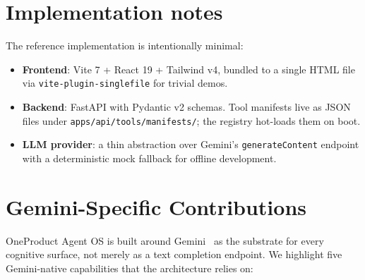 \documentclass[11pt,a4paper]{article}
\begin{document}
\section{Implementation notes}

The reference implementation is intentionally minimal:

\begin{itemize}
  \item \textbf{Frontend}: Vite 7 + React 19 + Tailwind v4, bundled to a single
    HTML file via \texttt{vite-plugin-singlefile} for trivial demos.
  \item \textbf{Backend}: FastAPI with Pydantic v2 schemas. Tool manifests live
    as JSON files under \texttt{apps/api/tools/manifests/}; the registry hot-loads
    them on boot.
  \item \textbf{LLM provider}: a thin abstraction over Gemini's
    \texttt{generateContent} endpoint with a deterministic mock fallback for
    offline development.
\end{itemize}

\section{Gemini-Specific Contributions}
\label{sec:gemini}

OneProduct Agent OS is built around Gemini~\cite{gemini2024} as the substrate
for every cognitive surface, not merely as a text completion endpoint. We
highlight five Gemini-native capabilities that the architecture relies on:
\end{document}
